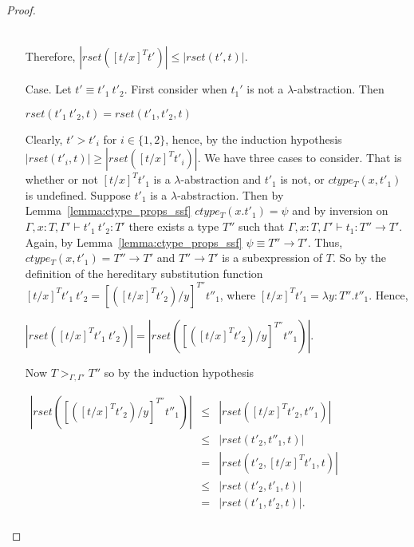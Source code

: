 \begin{proof}
\begin{itemize}
\begin{center}
\begin{math}
\begin{array}{lll}
      \end{array}
    \end{math}
  \end{center}
  Therefore, $|rset([t/x]^T t')| \leq |rset(t',t)|$.
  
\item[Case.] Let $t' \equiv t'_1\ t'_2$.  First consider when $t_1'$ is not a $\lambda$-abstraction. Then
  \begin{center}
    $rset(t'_1\ t'_2, t) = rset(t'_1, t'_2, t)$
  \end{center}  
  Clearly,  $t' > t'_i$ for $i \in \{1,2\}$, hence, by the induction hypothesis $|rset(t'_i,t)| \geq |rset([t/x]^T t'_i)|$.  
  We have three cases to consider.  That is whether or not $[t/x]^T t'_1$ is a $\lambda$-abstraction and $t'_1$ is not, or
  $ctype_T(x,t'_1)$ is undefined.  
  Suppose $t'_1$ is a $\lambda$-abstraction.
  Then by Lemma~\ref{lemma:ctype_props_ssf} $ctype_T(x.t'_1) = \psi$ and by inversion on $\Gamma,x:T,\Gamma' \vdash t'_1\ t'_2:T'$
  there exists a type $T''$ such that $\Gamma,x:T,\Gamma' \vdash t_1:T'' \to T'$.  Again, by Lemma~\ref{lemma:ctype_props_ssf}
  $\psi \equiv T'' \to T'$. Thus, $ctype_T(x,t'_1) = T'' \to T'$ and $T'' \to T'$ is a subexpression of $T$.
  So by the definition of the hereditary substitution function $[t/x]^T t'_1\ t'_2 = [([t/x]^T t'_2)/y]^{T''} t''_1$, where
  $[t/x]^T t'_1 = \lambda y:T''.t''_1$.  Hence,
  \begin{center}
    \begin{math}
      |rset([t/x]^T t'_1\ t'_2)| = |rset([([t/x]^T t'_2)/y]^{T''} t''_1)|.
    \end{math}
  \end{center}
  Now $T >_{\Gamma,\Gamma'} T''$ so by the induction hypothesis 
  \begin{center}
    \begin{math}
      \begin{array}{lll}
        |rset([([t/x]^T t'_2)/y]^{T''} t''_1)| & \leq & |rset([t/x]^T t'_2, t''_1)|\\
        & \leq & |rset(t'_2, t''_1, t)|\\
        & = & |rset(t'_2, [t/x]^T t'_1, t)|\\
        & \leq & |rset(t'_2, t'_1, t)|\\
        & = & |rset(t'_1, t'_2, t)|.\\
      \end{array}
    \end{math}
  \end{center}


\end{itemize}
\end{proof}
